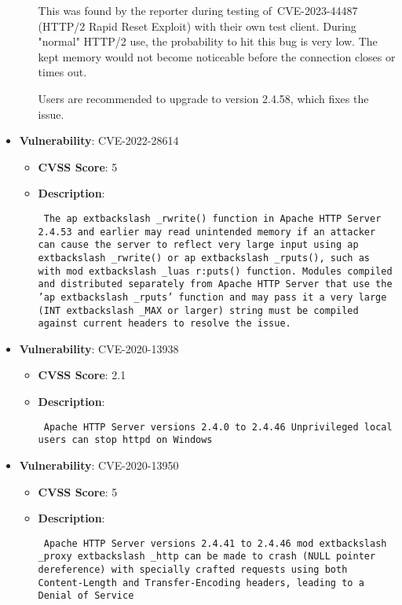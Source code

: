 \documentclass{article}
\begin{document}
\begin{itemize}
\begin{itemize}
{{This was found by the reporter during testing of CVE-2023-44487 (HTTP/2 Rapid Reset Exploit) with their own test client. During "normal" HTTP/2 use, the probability to hit this bug is very low. The kept memory would not become noticeable before the connection closes or times out.

Users are recommended to upgrade to version 2.4.58, which fixes the issue.
 }}
        \end{itemize}
    
        \item \textbf{Vulnerability}: CVE-2022-28614
        \begin{itemize}
            \item \textbf{CVSS Score}:  5 
            \item \textbf{Description}: \parbox{\linewidth}{\texttt{ The ap	extbackslash _rwrite() function in Apache HTTP Server 2.4.53 and earlier may read unintended memory if an attacker can cause the server to reflect very large input using ap	extbackslash _rwrite() or ap	extbackslash _rputs(), such as with mod	extbackslash _luas r:puts() function. Modules compiled and distributed separately from Apache HTTP Server that use the 'ap	extbackslash _rputs' function and may pass it a very large (INT	extbackslash _MAX or larger) string must be compiled against current headers to resolve the issue. }}
        \end{itemize}
    
        \item \textbf{Vulnerability}: CVE-2020-13938
        \begin{itemize}
            \item \textbf{CVSS Score}:  2.1 
            \item \textbf{Description}: \parbox{\linewidth}{\texttt{ Apache HTTP Server versions 2.4.0 to 2.4.46 Unprivileged local users can stop httpd on Windows }}
        \end{itemize}
    
        \item \textbf{Vulnerability}: CVE-2020-13950
        \begin{itemize}
            \item \textbf{CVSS Score}:  5 
            \item \textbf{Description}: \parbox{\linewidth}{\texttt{ Apache HTTP Server versions 2.4.41 to 2.4.46 mod	extbackslash _proxy	extbackslash _http can be made to crash (NULL pointer dereference) with specially crafted requests using both Content-Length and Transfer-Encoding headers, leading to a Denial of Service }}
        \end{itemize}
    

\end{itemize}
\end{document}
